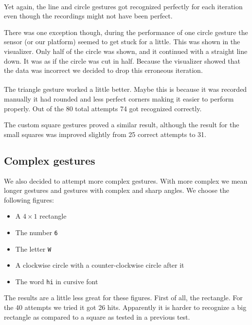\documentclass[a4paper]{article}
\providecommand{\tightlist}{%
\setlength{\itemsep}{0pt}\setlength{\parskip}{0pt}}
\begin{document}
  \paragraph{}
  Yet again, the line and circle gestures got recognized perfectly for each
  iteration even though the recordings might not have been perfect.

  There was one exception though, during the performance of one circle gesture
  the sensor (or our platform) seemed to get stuck for a little. This was shown
  in the visualizer. Only half of the circle was shown, and it continued with a
  straight line down. It was as if the circle was cut in half. Because the
  visualizer showed that the data was incorrect we decided to drop this erroneous
  iteration.

  \paragraph{}
  The triangle gesture worked a little better. Maybe this is because it was
  recorded manually it had rounded and less perfect corners making it easier to
  perform properly. Out of the 80 total attempts 74 got recognized correctly.

  The custom square gestures proved a similar result, although the result for
  the small squares was improved slightly from 25 correct attempts to 31.

  \subsection{Complex gestures}
  We also decided to attempt more complex gestures. With more complex we mean
  longer gestures and gestures with complex and sharp angles. We choose the
  following figures:

  \begin{itemize}
    \tightlist{}
    \item A $4\times1$ rectangle
    \item The number \verb_6_
    \item The letter \verb_W_
    \item A clockwise circle with a counter-clockwise circle after it
    \item The word \verb_hi_ in cursive font
  \end{itemize}

  The results are a little less great for these figures. First of all, the
  rectangle. For the 40 attempts we tried it got 26 hits. Apparently it is
  harder to recognize a big rectangle as compared to a square as tested in a
  previous test.
\end{document}
